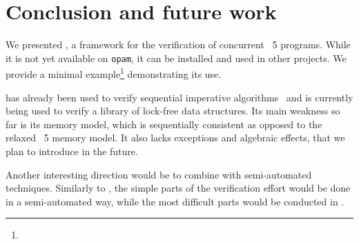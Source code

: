 \section{Conclusion and future work}

We presented \Zoo, a framework for the verification of concurrent \OCaml~5 programs.
While it is not yet available on \texttt{opam}, it can be installed and used in other \Rocq projects.
We provide a minimal example\footnote{} demonstrating its use.

\Zoo has already been used to verify sequential imperative algorithms~ and is currently being used to verify a library of lock-free data structures.
Its main weakness so far is its memory model, which is sequentially consistent as opposed to the relaxed \OCaml~5 memory model.
It also lacks exceptions and algebraic effects, that we plan to introduce in the future.

Another interesting direction would be to combine \Zoo with semi-automated techniques.
Similarly to \WhyThree, the simple parts of the verification effort would be done in a semi-automated way, while the most difficult parts would be conducted in \Rocq.
